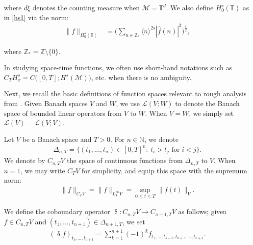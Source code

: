 \documentclass[letterpaper, 11pt,  reqno]{amsart}
\newcommand{\1}{\hspace{0.5mm}\textup{I}\hspace{0.5mm}}
\newcommand{\noi}{\noindent}
\newcommand{\Z}{\mathbb{Z}}
\newcommand{\T}{\mathbb{T}}
\renewcommand{\L}{\mathcal{L}}
\newcommand{\updl}{\updelta}
\newcommand{\Dl}{\Delta}
\newcommand{\ft}{\widehat}
\newcommand{\jb}[1]
{\langle #1 \rangle}
\newcommand{\M}{\mathcal{M}}
\newcommand{\N}{\mathbb{N}}
\newcommand{\cL}{\mathcal{L}}
\numberwithin{equation}{section}
\numberwithin{theorem}{section}
\begin{document}
\noi
where 
$d\xi$ denotes the counting measure when $\M = \T^d$.
We also define 
$ H_0^s(\T)$
as in \eqref{hs1}
via the norm:
\begin{align*}
\|  f  \|_{H^{s}_0(\T)}
& =
\bigg( \sum_{n\in \Z_*} \jb{n}^{2s} |\ft f( n)|^2 \bigg)^\frac 12 ,
\end{align*}


\noi
where 
$\Z_*= \Z\setminus \{0\}$.

In studying space-time functions, 
we often use short-hand notations such as
$C_T H^s_x  = C\big([0, T]; H^s(\M))$, etc.
 when there is no ambiguity.




\medskip

Next, we recall the basic definitions
of  function spaces relevant to rough analysis from \cite{CGLLO1}.
Given Banach spaces $V$ and $W$, we use $\L(V; W)$
to denote the Banach space of bounded linear operators from $V$ to $W$.
When $V = W$, we simply set $\L(V) = \L(V;V)$.



%





Let $V$ be a Banach space and $T>0$.
For $n\in\N$, we denote 
\begin{align*}
\Delta_{n, T} = 
\big\{ (t_1, \ldots, t_n) \in [0,T]^n: \ t_i > t_j 
\text{ for } i < j\big\}.
\end{align*}
We denote by $C_{n,T}V$ 
the space of continuous functions 
from $\Delta_{n,T}$ to $V$. When $n=1$,
we may write $C_T V$ for simplicity, 
and equip this space with the supremum norm: 
\begin{align*}
\|f\|_{C_T V} = \|f\|_{L^\infty_T V} = \sup_{0\leq t \leq T} \|f(t)\|_V.
\end{align*}



\noi
We define the coboundary operator 
$\updl: C_{n,T} V  \to C_{n+1,T} V$ 
as follows; 
given  $f\in C_{n,T} V$ 
and $(t_1,\ldots, t_{n+1}) \in \Dl_{{n+1},T}$, 
we set
\begin{align*}
(\updl f)_{t_1,\ldots , t_{n+1}} = 
\sum_{k=1}^{n+1} (-1)^{k} f_{t_1, \ldots, t_{k-1}, t_{k+1}, \ldots, t_{n+1}}.
\end{align*}
\end{document}
